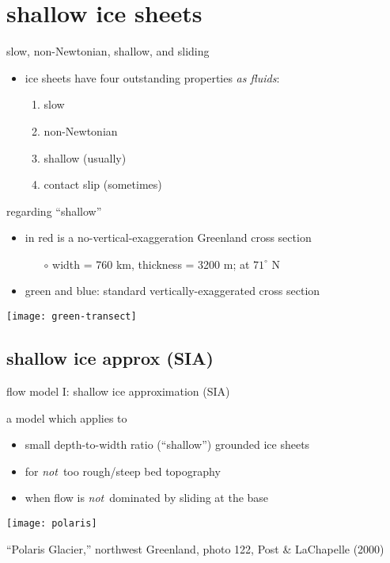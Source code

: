
\section{shallow ice sheets}

\begin{frame}{slow, non-Newtonian, shallow, and sliding}

\begin{itemize}
\item ice sheets have four outstanding properties \emph{as fluids}:
  \begin{enumerate}
  \item slow
  \item non-Newtonian
  \item shallow (usually)
  \item contact slip (sometimes)
  \end{enumerate}
\end{itemize}
\end{frame}


\begin{frame}{regarding ``shallow''}

\begin{itemize}
\item in \alert{red} is a no-vertical-exaggeration Greenland cross section
  \begin{itemize}
  \item[$\circ$] width = 760 km, thickness = 3200 m; at $71^\circ$ N
  \end{itemize}
\item green and blue: standard vertically-exaggerated cross section
\end{itemize}

\begin{center}
  \texttt{[image: green-transect]}
\end{center}
\end{frame}


\subsection{shallow ice approx (SIA)}

\begin{frame}{flow model I: shallow ice approximation (SIA)}

a model which applies to
\begin{itemize}
\item small depth-to-width ratio (``shallow'') grounded ice sheets
\item for \emph{not}\, too rough/steep bed topography
\item when flow is \emph{not}\, dominated by sliding at the base
\end{itemize}

\begin{center}
  \texttt{[image: polaris]}

\tiny ``Polaris Glacier,'' northwest Greenland, photo 122, Post \& LaChapelle (2000)
\end{center}

\end{frame}


